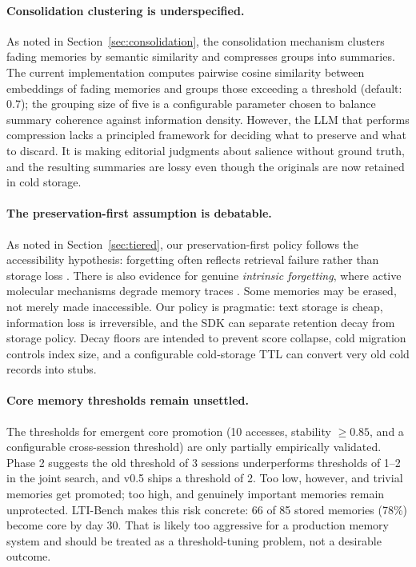 \documentclass[11pt,a4paper]{article}
\begin{document}
\paragraph{Consolidation clustering is underspecified.} As noted in Section~\ref{sec:consolidation}, the consolidation mechanism clusters fading memories by semantic similarity and compresses groups into summaries. The current implementation computes pairwise cosine similarity between embeddings of fading memories and groups those exceeding a threshold (default: 0.7); the grouping size of five is a configurable parameter chosen to balance summary coherence against information density. However, the LLM that performs compression lacks a principled framework for deciding what to preserve and what to discard. It is making editorial judgments about salience without ground truth, and the resulting summaries are lossy even though the originals are now retained in cold storage.

\paragraph{The preservation-first assumption is debatable.} As noted in Section~\ref{sec:tiered}, our preservation-first policy follows the accessibility hypothesis: forgetting often reflects retrieval failure rather than storage loss \citep{tulving1966availability}. There is also evidence for genuine \emph{intrinsic forgetting}, where active molecular mechanisms degrade memory traces \citep{davis2017biology}. Some memories may be erased, not merely made inaccessible. Our policy is pragmatic: text storage is cheap, information loss is irreversible, and the SDK can separate retention decay from storage policy. Decay floors are intended to prevent score collapse, cold migration controls index size, and a configurable cold-storage TTL can convert very old cold records into stubs.

\paragraph{Core memory thresholds remain unsettled.} The thresholds for emergent core promotion (10 accesses, stability $\geq 0.85$, and a configurable cross-session threshold) are only partially empirically validated. Phase 2 suggests the old threshold of 3 sessions underperforms thresholds of 1--2 in the joint search, and v0.5 ships a threshold of 2. Too low, however, and trivial memories get promoted; too high, and genuinely important memories remain unprotected. LTI-Bench makes this risk concrete: 66 of 85 stored memories (78\%) become core by day 30. That is likely too aggressive for a production memory system and should be treated as a threshold-tuning problem, not a desirable outcome.
\end{document}
